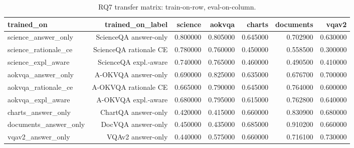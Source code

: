 \begin{table}
\caption{RQ7 transfer matrix: train-on-row, eval-on-column.}
\label{tab:rq7_transfer}
\begin{tabular}{lrrrrrr}
\toprule
trained_on & trained_on_label & science & aokvqa & charts & documents & vqav2 \\
\midrule
science_answer_only & ScienceQA
answer-only & 0.800000 & 0.805000 & 0.645000 & 0.702900 & 0.630000 \\
science_rationale_ce & ScienceQA
rationale CE & 0.780000 & 0.760000 & 0.450000 & 0.558500 & 0.300000 \\
science_expl_aware & ScienceQA
expl.-aware & 0.740000 & 0.765000 & 0.460000 & 0.490500 & 0.410000 \\
aokvqa_answer_only & A-OKVQA
answer-only & 0.690000 & 0.825000 & 0.635000 & 0.676700 & 0.700000 \\
aokvqa_rationale_ce & A-OKVQA
rationale CE & 0.665000 & 0.790000 & 0.645000 & 0.764000 & 0.600000 \\
aokvqa_expl_aware & A-OKVQA
expl.-aware & 0.680000 & 0.795000 & 0.615000 & 0.762800 & 0.640000 \\
charts_answer_only & ChartQA
answer-only & 0.420000 & 0.415000 & 0.660000 & 0.830900 & 0.680000 \\
documents_answer_only & DocVQA
answer-only & 0.450000 & 0.435000 & 0.685000 & 0.910200 & 0.660000 \\
vqav2_answer_only & VQAv2
answer-only & 0.440000 & 0.575000 & 0.660000 & 0.716100 & 0.730000 \\
\bottomrule
\end{tabular}
\end{table}

